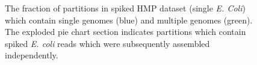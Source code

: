 \documentclass[11pt]{article} %
\begin{document}
\begin{figure}[ht]
\caption{The fraction of partitions in spiked HMP dataset (single \emph{E. Coli}) which contain single genomes (blue) and multiple genomes (green).  The exploded pie chart section indicates partitions which contain spiked \emph{E. coli} reads which were subsequently assembled independently.}
\label{ecolimap}
\end{figure}
\end{document}
